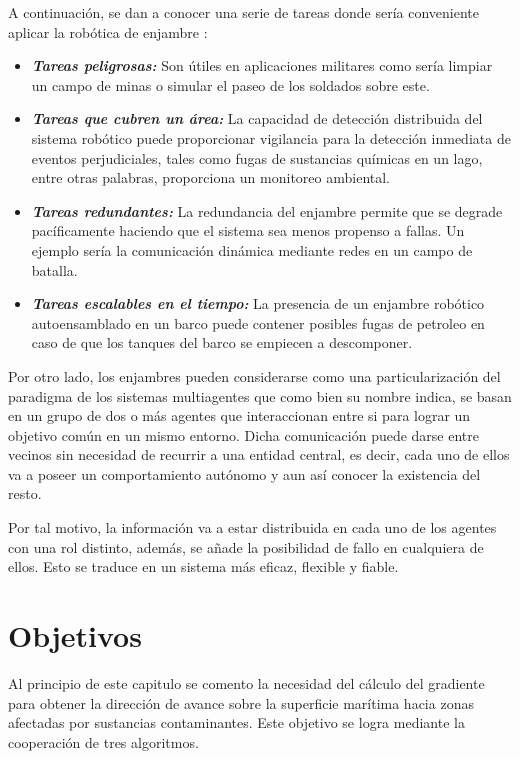 A continuación, se dan a conocer una serie de tareas donde sería conveniente aplicar la robótica de enjambre \cite{Aplicacion_3} \cite{Aplicacion_4}:

\begin{itemize}
	\item \textbf{\emph{Tareas peligrosas:}} Son útiles en aplicaciones militares como sería limpiar un campo de minas o simular el paseo de los soldados sobre este.
	\item \textbf{\emph{Tareas que cubren un área:}} La capacidad de detección distribuida del sistema robótico puede proporcionar vigilancia para la detección inmediata de eventos perjudiciales, tales como fugas de sustancias químicas en un lago, entre otras palabras, proporciona un monitoreo ambiental.
	\item \textbf{\emph{Tareas redundantes:}} La redundancia del enjambre permite que se degrade pacíficamente haciendo que el sistema sea menos propenso a fallas. Un ejemplo sería la comunicación dinámica mediante redes en un campo de batalla.
	\item \textbf{\emph{Tareas escalables en el tiempo:}} La presencia de un enjambre robótico autoensamblado en un barco puede contener posibles fugas de petroleo en caso de que los tanques del barco se empiecen a descomponer.
\end{itemize}

Por otro lado, los enjambres pueden considerarse como una particularización del paradigma de los sistemas multiagentes que como bien su nombre indica, se basan en un grupo de dos o más agentes que interaccionan entre si para lograr un objetivo común en un mismo entorno. Dicha comunicación puede darse entre vecinos sin necesidad de recurrir a una entidad central, es decir, cada uno de ellos va a poseer un comportamiento autónomo y aun así conocer la existencia del resto.

Por tal motivo, la información va a estar distribuida en cada uno de los agentes con una rol distinto, además, se añade la posibilidad de fallo en cualquiera de ellos. Esto se traduce en un sistema más eficaz, flexible y fiable. 

\section{Objetivos} \label{Objetivos_Principales}

Al principio de este capitulo se comento la necesidad del cálculo del gradiente para obtener la dirección de avance sobre la superficie marítima hacia zonas afectadas por sustancias contaminantes. Este objetivo se logra mediante la cooperación de tres algoritmos.

